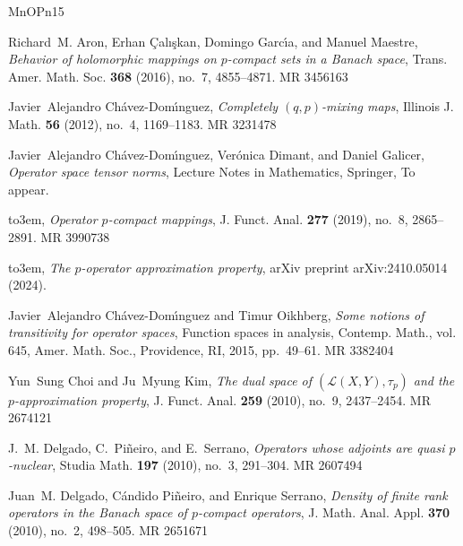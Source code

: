 \documentclass[11pt]{amsart}
\numberwithin{equation}{section}
\begin{document}
\providecommand{\bysame}{\leavevmode\hbox to3em{\hrulefill}\thinspace}
\providecommand{\MR}{\relax\ifhmode\unskip\space\fi MR }
\providecommand{\MRhref}[2]{%
  \href{http://www.ams.org/mathscinet-getitem?mr=#1}{#2}
}
\providecommand{\href}[2]{#2}
\begin{thebibliography}{MnOPn15}

Richard~M. Aron, Erhan \c{C}al\i \c{s}kan, Domingo Garc\'{\i}a, and Manuel
  Maestre, \emph{Behavior of holomorphic mappings on {$p$}-compact sets in a
  {B}anach space}, Trans. Amer. Math. Soc. \textbf{368} (2016), no.~7,
  4855--4871. \MR{3456163}

Javier~Alejandro Ch\'{a}vez-Dom\'{\i}nguez, \emph{Completely {$(q,p)$}-mixing
  maps}, Illinois J. Math. \textbf{56} (2012), no.~4, 1169--1183. \MR{3231478}

Javier~Alejandro Ch\'{a}vez-Dom\'{\i}nguez, Ver\'{o}nica Dimant, and Daniel
  Galicer, \emph{Operator space tensor norms}, Lecture Notes in Mathematics,
  Springer, To appear.

\bysame, \emph{Operator {$p$}-compact mappings}, J. Funct. Anal. \textbf{277}
  (2019), no.~8, 2865--2891. \MR{3990738}

\bysame, \emph{The $ p $-operator approximation property}, arXiv preprint
  arXiv:2410.05014 (2024).

Javier~Alejandro Ch\'{a}vez-Dom\'{\i}nguez and Timur Oikhberg, \emph{Some
  notions of transitivity for operator spaces}, Function spaces in analysis,
  Contemp. Math., vol. 645, Amer. Math. Soc., Providence, RI, 2015, pp.~49--61.
  \MR{3382404}

Yun~Sung Choi and Ju~Myung Kim, \emph{The dual space of
  {$(\mathcal{L}(X,Y),\tau_p)$} and the {$p$}-approximation property}, J.
  Funct. Anal. \textbf{259} (2010), no.~9, 2437--2454. \MR{2674121}

J.~M. Delgado, C.~Pi{\~n}eiro, and E.~Serrano, \emph{Operators whose adjoints
  are quasi {$p$}-nuclear}, Studia Math. \textbf{197} (2010), no.~3, 291--304.
  \MR{2607494}

Juan~M. Delgado, Cándido Piñeiro, and Enrique Serrano, \emph{Density of
  finite rank operators in the {B}anach space of {$p$}-compact operators}, J.
  Math. Anal. Appl. \textbf{370} (2010), no.~2, 498--505. \MR{2651671}


\end{thebibliography}
\end{document}

